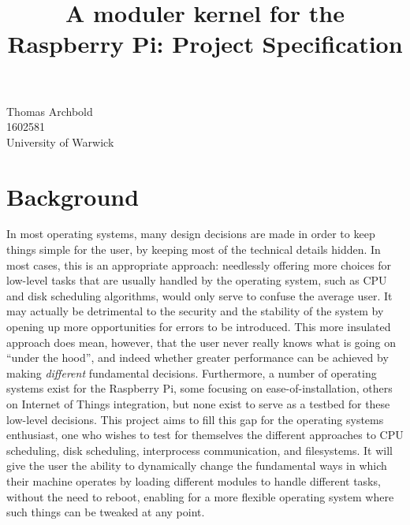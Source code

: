 \documentclass[10pt,a4paper]{article}
\title{A moduler kernel for the Raspberry Pi: Project Specification}
\begin{document}
\maketitle

\begin{center}
    Thomas Archbold \\
    1602581 \\
    University of Warwick \\
\end{center}

\section*{Background}
In most operating systems, many design decisions are made in order to keep
things simple for the user, by keeping most of the technical details hidden. In
most cases, this is an appropriate approach: needlessly offering more choices
for low-level tasks that are usually handled by the operating system, such as
CPU and disk scheduling algorithms, would only serve to confuse the average
user. It may actually be detrimental to the security and the stability of the
system by opening up more opportunities for errors to be introduced.  This more
insulated approach does mean, however, that the user never really knows what is
going on ``under the hood'', and indeed whether greater performance can be
achieved by making \textit{different} fundamental decisions.  Furthermore, a
number of operating systems exist for the Raspberry Pi, some focusing on
ease-of-installation, others on Internet of Things integration, but none exist
to serve as a testbed for these low-level decisions. This project aims to fill
this gap for the operating systems enthusiast, one who wishes to test for
themselves the different approaches to CPU scheduling, disk scheduling,
interprocess communication, and filesystems. It will give the user the ability
to dynamically change the fundamental ways in which their machine operates by
loading different modules to handle different tasks, without the need to
reboot, enabling for a more flexible operating system where such things can be
tweaked at any point.
\end{document}
